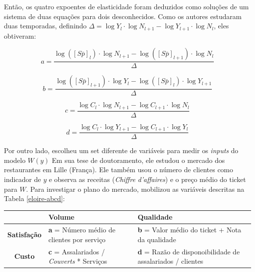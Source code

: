 \documentclass[a4paper, 12pt, openright, oneside, german, french, english, brazil]{abntex2}
\begin{document}
	Então, os quatro expoentes de elasticidade foram deduzidos como soluções de um sistema de duas equações para dois desconhecidos. Como os autores estudaram duas temporadas, definindo $\Delta = \log Y_l \cdot \log N_{l+1} - \log Y_{l+1} \cdot \log N_l$, eles obtiveram:
	
	$$ a = \frac{ \log([S\bar{p}]_l) \cdot \log N_{l+1} - \log([S\bar{p}]_{l+1}) \cdot \log N_{l} }{\Delta} $$
	
	$$ b = \frac{ \log([S\bar{p}]_{l+1}) \cdot \log Y_{l} - \log([S\bar{p}]_{l}) \cdot \log Y_{l+1} }{\Delta} $$
	
	$$ c = \frac{ \log C_l \cdot \log N_{l+1} - \log C_{l+1} \cdot \log N_{l} }{\Delta} $$
	
	\begin{equation}
	\label{parameters}
	d = \frac{ \log C_l \cdot \log Y_{l+1} - \log C_{l+1} \cdot \log Y_{l} }{\Delta}
	\end{equation}
	
	

	
	
	
	Por outro lado,  escolheu um set diferente de variáveis para medir os \textit{inputs} do modelo $W(y)$ Em sua tese de doutoramento, ele estudou o mercado dos restaurantes em Lille (França). Ele também usou o número de clientes como indicador de $y$ e observa as receitas (\textit{Chiffre d'affaires}) e o preço médio do ticket para $W$. Para investigar o plano do mercado,  mobilizou as variáveis descritas na Tabela \ref{eloire-abcd}:
	
	\begin{table}[ht]
		{\begin{tabular}{c | p{5cm} p{5cm}}
				\hline
				& \textbf{Volume}  & \textbf{Qualidade} \\
				\hline
				\textbf{Satisfação}  & \textbf{a} = Número médio de clientes por serviço & \textbf{b} = Valor médio do ticket + Nota da qualidade \\
				\textbf{Custo} & \textbf{c} = Assalariados / \textit{Couverts} * Serviços & \textbf{d} = Razão de disponoibilidade de assalariados / clientes \\
				\hline
			\end{tabular}
		}
		{}
	\end{table}
\end{document}
